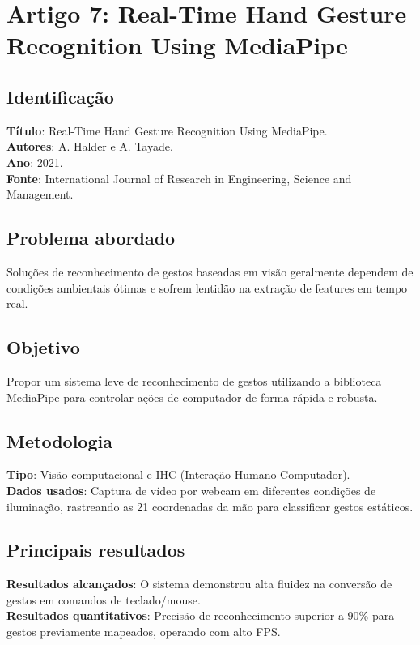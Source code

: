 \documentclass[12pt, a4paper]{article}
\begin{document}
\section{Artigo 7: Real-Time Hand Gesture Recognition Using MediaPipe}
\subsection{Identificação}
\textbf{Título}: Real-Time Hand Gesture Recognition Using MediaPipe.\\
\textbf{Autores}: A. Halder e A. Tayade.\\
\textbf{Ano}: 2021.\\
\textbf{Fonte}: International Journal of Research in Engineering, Science and Management.\\
\subsection{Problema abordado}
Soluções de reconhecimento de gestos baseadas em visão geralmente dependem de condições ambientais ótimas e sofrem lentidão na extração de features em tempo real.\\
\subsection{Objetivo}
Propor um sistema leve de reconhecimento de gestos utilizando a biblioteca MediaPipe para controlar ações de computador de forma rápida e robusta.\\
\subsection{Metodologia}
\textbf{Tipo}: Visão computacional e IHC (Interação Humano-Computador).\\
\textbf{Dados usados}: Captura de vídeo por webcam em diferentes condições de iluminação, rastreando as 21 coordenadas da mão para classificar gestos estáticos.\\
\subsection{Principais resultados}
\textbf{Resultados alcançados}: O sistema demonstrou alta fluidez na conversão de gestos em comandos de teclado/mouse.\\
\textbf{Resultados quantitativos}: Precisão de reconhecimento superior a 90\% para gestos previamente mapeados, operando com alto FPS.\\
\end{document}
